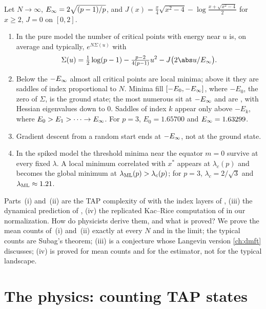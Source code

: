 \begin{refsection}
\begin{physicsbox}
Let $N\to\infty$, $E_\infty=2\sqrt{(p-1)/p}$, and $J(x)=\frac x4\sqrt{x^2-4}-\log\frac{x+\sqrt{x^2-4}}2$ for $x\ge2$, $J=0$ on $[0,2]$.
\begin{enumerate}
\item In the pure model the number of critical points with energy near $u$ is, on average and typically, $e^{N\Sigma(u)}$ with
\[
\Sigma(u)=\tfrac12\log(p-1)-\tfrac{p-2}{4(p-1)}u^2-J\bigl(2\abs u/\kacriceinf\bigr).
\]
\item Below the  $-E_\infty$ almost all critical points are local minima; above it they are saddles of index proportional to $N$. Minima fill $[-E_0,-E_\infty]$, where $-E_0$, the zero of $\Sigma$, is the ground state; the most numerous sit at $-E_\infty$ and are , with Hessian eigenvalues down to $0$. Saddles of index $k$ appear only above $-E_k$, where $E_0>E_1>\dots\to E_\infty$. For $p=3$, $E_0=1.65700$ and $E_\infty=1.63299$.
\item Gradient descent from a random start ends at $-E_\infty$, not at the ground state.
\item In the spiked model the threshold minima near the equator $m=0$ survive at every fixed $\lambda$. A local minimum correlated with $x^*$ appears at $\lambda_c(p)$ and becomes the global minimum at $\lambda_{\mathrm{ML}}(p)>\lambda_c(p)$; for $p=3$, $\lambda_c=2/\sqrt3$ and $\lambda_{\mathrm{ML}}\approx1.21$.
\end{enumerate}
\end{physicsbox}

Parts~(i) and~(ii) are the TAP complexity of \textcite{CrisantiSommers1995} with the index layers of \textcite{KurchanLaloux1996}, (iii) the dynamical prediction of \textcite{CugliandoloKurchan1993}, (iv) the replicated Kac--Rice computation of \textcite{RosEtAl2019} in our normalization. How do physicists derive them, and what is proved? We prove the mean counts of~(i) and~(ii) exactly at every $N$ and in the limit; the typical counts are Subag's theorem; (iii) is a conjecture whose Langevin version \cref{ch:dmft} discusses; (iv) is proved for mean counts and for the estimator, not for the typical landscape.

\section{The physics: counting TAP states}\label{sec:kacrice:physics}


\end{refsection}
